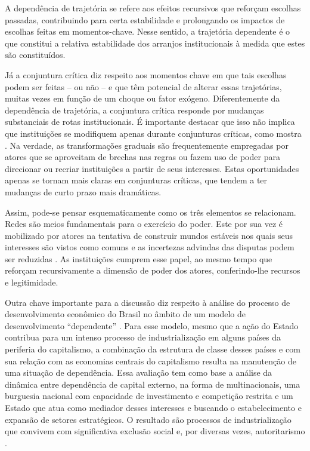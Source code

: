 A dependência de trajetória
\citep{mahoney_path_2000} se
refere aos efeitos recursivos que reforçam escolhas passadas,
contribuindo para certa estabilidade e prolongando os impactos de
escolhas feitas em momentos-chave. Nesse sentido, a trajetória
dependente é o que constitui a relativa estabilidade dos arranjos
institucionais à medida que estes são constituídos.

Já a conjuntura crítica
\citep{mahoney_comparative-historical_2004} diz
respeito aos momentos chave em que tais escolhas podem ser feitas -- ou
não -- e que têm potencial de alterar essas trajetórias, muitas vezes em
função de um choque ou fator exógeno. Diferentemente da dependência de
trajetória, a conjuntura crítica responde por mudanças substanciais de
rotas institucionais. É importante destacar que isso não implica que
instituições se modifiquem apenas durante conjunturas críticas, como
mostra \citet{thelen2010}. Na verdade, as transformações graduais são frequentemente
empregadas por atores que se aproveitam de brechas nas regras ou fazem
uso de poder para direcionar ou recriar instituições a partir de seus
interesses. Estas oportunidades apenas se tornam mais claras em
conjunturas críticas, que tendem a ter mudanças de curto prazo mais
dramáticas.

Assim, pode-se pensar esquematicamente como os três elementos se
relacionam. Redes são meios fundamentais para o exercício do poder. Este
por sua vez é mobilizado por atores na tentativa de construir mundos
estáveis nos quais seus interesses são vistos como comuns e as
incertezas advindas das disputas podem ser reduzidas
\citep{fligstein1996}. As
instituições cumprem esse papel, ao mesmo tempo que reforçam
recursivamente a dimensão de poder dos atores, conferindo-lhe recursos e
legitimidade.

Outra chave importante para a discussão diz respeito à análise do
processo de desenvolvimento econômico do Brasil no âmbito de um modelo
de desenvolvimento ``dependente''
\citep{evans_dependent_1979,evans_embedded_2023}.
Para esse modelo, mesmo que a ação do Estado contribua para um intenso
processo de industrialização em alguns países da periferia do
capitalismo, a combinação da estrutura de classe desses países e com sua
relação com as economias centrais do capitalismo resulta na manutenção
de uma situação de dependência. Essa avaliação tem como base a análise
da dinâmica entre dependência de capital externo, na forma de
multinacionais, uma burguesia nacional com capacidade de investimento e
competição restrita e um Estado que atua como mediador desses interesses
e buscando o estabelecimento e expansão de setores estratégicos. O
resultado são processos de industrialização que convivem com
significativa exclusão social e, por diversas vezes, autoritarismo
\citep{evans_dependent_1979}.

